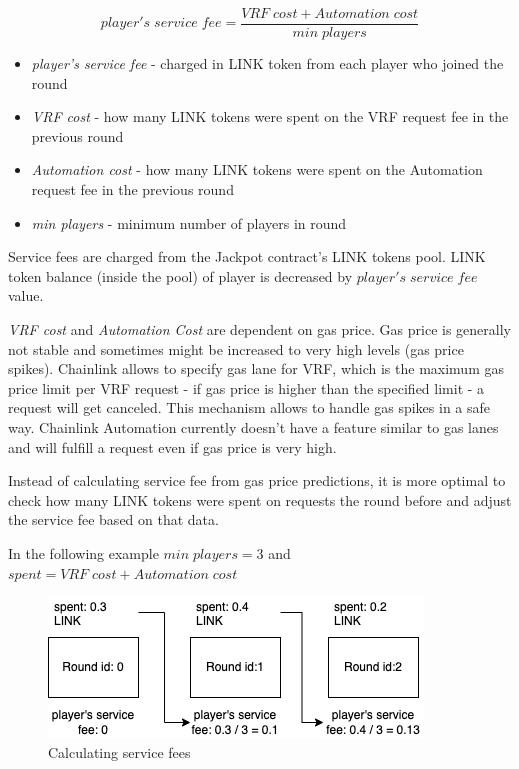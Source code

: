 \documentclass[12pt]{article}
\begin{document}
\[ player's\;service\;fee = \frac{VRF\;cost + Automation\;cost}{min\;players} \]

\begin{itemize}
    \item \textit{player's service fee} - charged in LINK token from each player who joined the round
    \item \textit{VRF cost} - how many LINK tokens were spent on the VRF request fee in the previous round
    \item \textit{Automation cost} - how many LINK tokens were spent on the Automation request fee in the previous round
    \item \textit{min players} - minimum number of players in round
\end{itemize}

Service fees are charged from the Jackpot contract's LINK tokens pool. LINK token balance (inside the pool) of player is decreased by \(player's\;service\;fee\) value.

\hfill

\textit{VRF cost} and \textit{Automation Cost} are dependent on gas price\cite{gas}. Gas price is generally not stable and sometimes might be increased to very high levels (gas price spikes). Chainlink allows to specify gas lane for VRF, which is the maximum gas price limit per VRF request - if gas price is higher than the specified limit - a request will get canceled. This mechanism allows to handle gas spikes in a safe way. Chainlink Automation currently doesn't have a feature similar to gas lanes and will fulfill a request even if gas price is very high. 

Instead of calculating service fee from gas price predictions, it is more optimal to check how many LINK tokens were spent on requests the round before and adjust the service fee based on that data.

In the following example \(min\;players = 3\) and \(spent = VRF\;cost + Automation\;cost\)
\begin{figure}[!ht]
    \centering
    \includegraphics[scale=0.8]{images/fees2.png} 
    \caption{Calculating service fees}
    \label{fig:b1}
\end{figure}
\FloatBarrier
\end{document}
